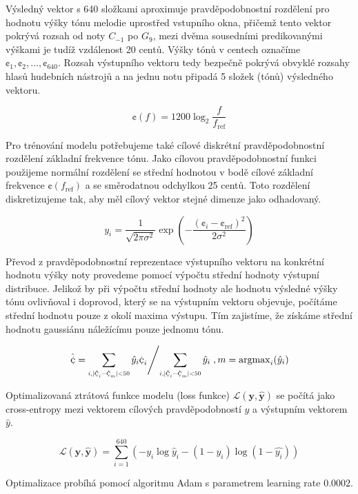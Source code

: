 Výsledný vektor s 640 složkami aproximuje pravděpodobnostní rozdělení pro hodnotu výšky tónu melodie uprostřed vstupního okna, přičemž tento vektor pokrývá rozsah od noty $C_{-1}$ po $G_{9}$, mezi dvěma sousedními predikovanými výškami je tudíž vzdálenost 20 centů. Výšky tónů v centech označíme $\cent_1, \cent_2, \dots, \cent_{640}$. Rozsah výstupního vektoru tedy bezpečně pokrývá obvyklé rozsahy hlasů hudebních nástrojů a na jednu notu připadá 5 složek (tónů) výsledného vektoru.

    $$\cent(f) = 1200 \log_2{\frac{f}{f_{\mathrm{ref}}}}$$

Pro trénování modelu potřebujeme také cílové diskrétní pravděpodobnostní rozdělení základní frekvence tónu. Jako cílovou pravděpodobnostní funkci použijeme normální rozdělení se střední hodnotou v bodě cílové základní frekvence $\cent(f_{\mathrm{ref}})$ a se směrodatnou odchylkou 25 centů. Toto rozdělení diskretizujeme tak, aby měl cílový vektor stejné dimenze jako odhadovaný.

    $$y_i = \frac{1}{\sqrt{2 \pi \sigma^2}}\exp{(-\frac{(\cent_i - \cent_{\mathrm{ref}})^2}{2 \sigma^2})}$$

Převod z pravděpodobnostní reprezentace výstupního vektoru na konkrétní hodnotu výšky noty provedeme pomocí výpočtu střední hodnoty výstupní distribuce. Jelikož by při výpočtu střední hodnoty ale hodnotu výsledné výšky tónu ovlivňoval i doprovod, který se na výstupním vektoru objevuje, počítáme střední hodnotu pouze z okolí maxima výstupu. Tím zajistíme, že získáme střední hodnotu gaussiánu náležícímu pouze jednomu tónu.

    $$ \left. \hat{\cent} = \sum_{\scaleto{i, \lvert \cent_i - \cent_m \rvert < 50}{8pt}} {\hat{y}_i \cent_i} \middle/ \sum_{\scaleto{i, \lvert \cent_i - \cent_m \rvert < 50}{8pt}} \hat{y}_i \right., m = \mathrm{argmax}_i(\hat{y}_i)$$

Optimalizovaná ztrátová funkce modelu (loss funkce) $\mathcal{L}(\mathbf{y}, \mathbf{\hat{y}})$ se počítá jako cross-entropy mezi vektorem cílových pravděpodobností $y$ a výstupním vektorem $\hat{y}$.

    $$\mathcal{L}(\mathbf{y}, \mathbf{\hat{y}}) = \sum_{i = 1}^{640}{(-y_i\log\hat{y}_i - (1-y_i)\log(1-\hat{y_i}))}$$

Optimalizace probíhá pomocí algoritmu Adam \citep{Kingma2014} s parametrem learning rate $0.0002$.


